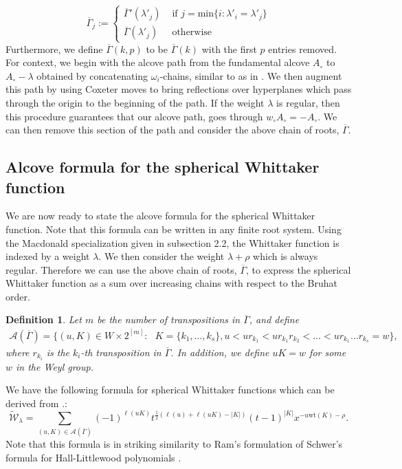\documentclass[11pt]{amsart}
\newtheorem{definition}{Definition}[section]
\begin{document}
{\begin{equation}
\overline{\Gamma}_{j}:=
\begin{cases}
\overline{\Gamma}'(\lambda'_{j}) & \textrm{ if } j=\textrm{min}\{i:\lambda'_{i}=\lambda'_{j}\}\\
\overline{\Gamma}(\lambda'_{j}) & \textrm{ otherwise}
\end{cases}
\end{equation}
Furthermore, we define $\overline{\Gamma}(k,p)$ to be $\overline{\Gamma}(k)$ with the first $p$ entries removed.
\newline\indent For context, we begin with the alcove path from the fundamental alcove $A_{\circ}$ to $A_{\circ}-\lambda$ obtained by concatenating $\omega_{i}$-chains, similar to as in \cite[Section 3.1]{CL2}. We then augment this path by using Coxeter moves to bring reflections over hyperplanes which pass through the origin to the beginning of the path. If the weight $\lambda$ is regular, then this procedure guarantees that our alcove path, goes through $w_{\circ}A_{\circ}=-A_{\circ}$. We can then remove this section of the path and consider the above chain of roots, $\overline{\Gamma}$.



\subsection{Alcove formula for the spherical Whittaker function}
We are now ready to state the alcove formula for the spherical Whittaker function. Note that this formula can be written in any finite root system. Using the Macdonald specialization given in subsection 2.2, the Whittaker function is indexed by a weight $\lambda$. We then consider the weight $\lambda+\rho$ which is always regular. Therefore we can use the above chain of roots, $\overline{\Gamma}$, to express the spherical Whittaker function as a sum over increasing chains with respect to the Bruhat order. 
\begin{definition} Let $m$ be the number of transpositions in $\overline{\Gamma}$, and define
\begin{align*}
\mathcal{A}(\overline{\Gamma})=\{(u,K)\in W\times2^{[m]}:\text{ } K=\{k_{1},\ldots,k_{s}\}, u<ur_{k_{1}}<ur_{k_{1}}r_{k_{2}}<\ldots<ur_{k_{1}}\ldots r_{k_{s}}=w\},
\end{align*}
where $r_{k_{i}}$ is the $k_{i}$-th transposition in $\overline{\Gamma}$. In addition, we define $uK=w$ for some $w$ in the Weyl group.
\end{definition}
We have the following formula for spherical Whittaker functions which can be derived from \cite[Theorem 6.2]{OS}.:
\begin{equation}
\widetilde{\mathcal{W}}_{\lambda}=\sum_{(u,K)\in\mathcal{A}(\overline{\Gamma})}(-1)^{\ell(uK)}t^{\frac{1}{2}(\ell(u)+\ell(uK)-|K|)}(t-1)^{|K|}x^{-u\text{wt}(K)-\rho}.
\end{equation}
Note that this formula is in striking similarity to Ram's formulation of Schwer's formula for Hall-Littlewood polynomials \cite[Theorem 2.7]{CL1}.









}
\end{document}

